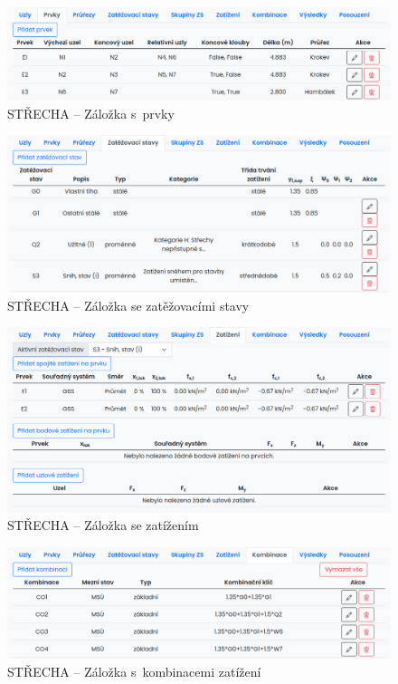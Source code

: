 \begin{figure}[H]
    \includegraphics{assets/figures/wbapp/members_tab.png}
    \caption{STŘECHA -- Záložka s~prvky}
    \label{fig:members}
\end{figure}

\begin{figure}[H]
    \includegraphics{assets/figures/wbapp/load_cases_tab.png}
    \caption{STŘECHA -- Záložka se zatěžovacími stavy}
    \label{fig:load_cases}
\end{figure}

\begin{figure}[H]
    \includegraphics{assets/figures/wbapp/loads_tab.png}
    \caption{STŘECHA -- Záložka se zatížením}
    \label{fig:loads}
\end{figure}

\begin{figure}[H]
    \includegraphics{assets/figures/wbapp/combos_tab.png}
    \caption{STŘECHA -- Záložka s~kombinacemi zatížení}
    \label{fig:combos_tab}
\end{figure}

